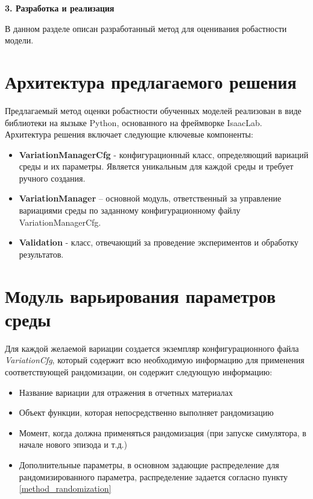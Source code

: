 \newpage
\begin{center}
  \textbf{\large 3. Разработка и реализация}
\end{center}

В данном разделе описан разработанный метод для оценивания робастности модели.

\section{Архитектура предлагаемого решения}

    Предлагаемый метод оценки робастности обученных моделей реализован в виде библиотеки на яызыке Python, основанного на фреймворке IsaacLab. Архитектура решения включает следующие ключевые компоненты:
        \begin{itemize}
            \item \textbf{VariationManagerCfg} - конфигурационный класс, определяющий вариаций среды и их параметры. Является уникальным для каждой среды и требует ручного создания. 
            \item \textbf{VariationManager} – основной модуль, ответственный за управление вариациями среды по заданному конфигурационному файлу VariationManagerCfg.
            \item \textbf{Validation} - класс, отвечающий за проведение экспериментов и обработку результатов.
        \end{itemize}

\section{Модуль варьирования параметров среды}
    Для каждой желаемой вариации создается экземпляр конфигурационного файла \textit{VariationCfg}, который содержит всю необходимую информацию для применения соответствующей рандомизации, он содержит следующую информацию:

    \begin{itemize}
        \item Название вариации для отражения в отчетных материалах
        \item Объект функции, которая непосредственно выполняет рандомизацию
        \item Момент, когда должна применяться рандомизация (при запуске симулятора, в начале нового эпизода и т.д.)
        \item Дополнительные параметры, в основном задающие распределение для рандомизированного параметра, распределение задается согласно пункту \ref{method_randomization}
    \end{itemize} 

